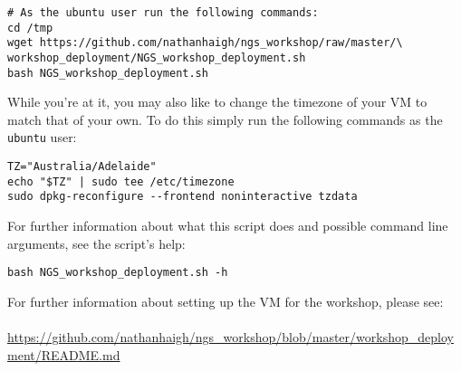 \begin{lstlisting}
# As the ubuntu user run the following commands:
cd /tmp
wget https://github.com/nathanhaigh/ngs_workshop/raw/master/\
workshop_deployment/NGS_workshop_deployment.sh
bash NGS_workshop_deployment.sh
\end{lstlisting}

While you're at it, you may also like to change the timezone of your VM to match
that of your own. To do this simply run the following commands as the
\texttt{ubuntu} user:
\begin{lstlisting}
TZ="Australia/Adelaide"
echo "$TZ" | sudo tee /etc/timezone
sudo dpkg-reconfigure --frontend noninteractive tzdata
\end{lstlisting}

For further information about what this script does and possible command line
arguments, see the script's help:
\begin{lstlisting}
bash NGS_workshop_deployment.sh -h
\end{lstlisting}


For further information about setting up the VM for the workshop, please see:
\\\\
\url{https://github.com/nathanhaigh/ngs_workshop/blob/master/workshop_deployment/README.md}
